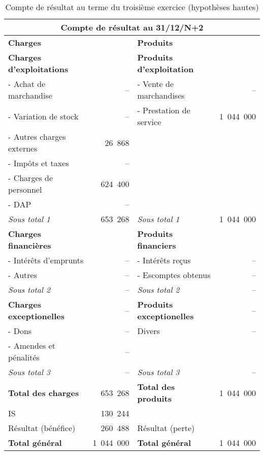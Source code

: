 		\begin{table}[h]
		  \centering
		  \begin{tabular}{|l|r|l|r|}
			\hline
			\multicolumn{4}{|c|}{\bf Compte de r\'esultat au 31/12/N+2}\\
			\hline
			{\bf Charges} & & {\bf Produits} & \\
			\hline
			{\bf Charges d'exploitations} & & {\bf Produits d'exploitation} & \\
			- Achat de marchandise & -- & - Vente de marchandises & --\\
			- Variation de stock & -- & - Prestation de service & 1~044~000\\
			- Autres charges externes & 26~868 & & \\
			- Impôts et taxes & -- & & \\
			- Charges de personnel & 624~400 & & \\
			- DAP & -- & & \\
			\cline{2-2}\cline{4-4}
			{\it Sous total 1} & 653~268 & {\it Sous total 1} & 1~044~000\\
			\cline{2-2}\cline{4-4}
			{\bf Charges financi\`eres} & & {\bf Produits financiers} & \\
			- Int\'er\^ets d'emprunts & -- & - Int\'er\^ets re\c cus & --\\
			- Autres & -- & - Escomptes obtenus & -- \\
			\cline{2-2}\cline{4-4}
			{\it Sous total 2} & -- & {\it Sous total 2} & -- \\
			\cline{2-2}\cline{4-4}
			{\bf Charges exceptionelles} & -- & {\bf Produits exceptionelles} & --\\
			- Dons & -- & Divers & --\\
			- Amendes et p\'enalit\'es & -- & & \\
			\cline{2-2}\cline{4-4}
			{\it Sous total 3} & -- & {\it Sous total 3} & -- \\
			\cline{2-2}\cline{4-4}
			{\bf Total des charges} & 653~268 & {\bf Total des produits} & 1~044~000 \\
			\cline{2-2}\cline{4-4}
			IS & 130~244 & & \\
			R\'esultat (b\'en\'efice) & 260~488 & R\'esultat (perte) & \\
			\cline{2-2}\cline{4-4}
			{\bf Total g\'en\'eral} & 1~044~000 & {\bf Total g\'en\'eral} & 1~044~000\\
			\hline
		  \end{tabular}
		  \caption{Compte de r\'esultat au terme du troisi\`eme exercice (hypoth\`eses hautes)}
		  \label{tab:hypHN2}
		\end{table}

